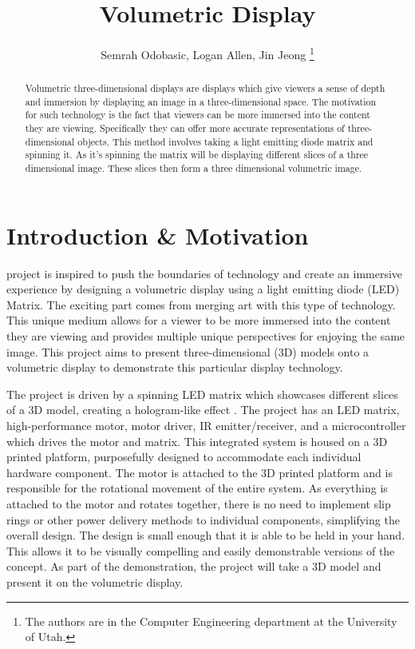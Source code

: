 \documentclass[11pt,journal]{IEEEtran}
\begin{document}
\title{Volumetric Display}

\author{Semrah Odobasic, Logan Allen, Jin Jeong
  \thanks{The authors are in the Computer Engineering
    department at the University of Utah.}
}
\maketitle

\begin{abstract}
 Volumetric three-dimensional displays are displays which give viewers a sense of depth and immersion by displaying an image in a three-dimensional space. The motivation for such technology is the fact that viewers can be more immersed into the content they are viewing. Specifically they can offer more accurate representations of three-dimensional objects. This method involves taking a light emitting diode matrix and spinning it. As it’s spinning the matrix will be displaying different slices of a three dimensional image. These slices then form a three dimensional volumetric image.


\end{abstract}

\section{Introduction \& Motivation}

 project is inspired to push the boundaries of technology and create an immersive experience by designing a volumetric display using a light emitting diode (LED) Matrix. The exciting part comes from merging art with this type of technology. This unique medium allows for a viewer to be more immersed into the content they are viewing and provides multiple unique perspectives for enjoying the same image. This project aims to present three-dimensional (3D) models onto a volumetric display to demonstrate this particular display technology.

The project is driven by a spinning LED matrix which showcases different slices of a 3D model, creating a hologram-like effect \cite{Sun2012ADP}. The project has an LED matrix, high-performance motor, motor driver, IR emitter/receiver, and a microcontroller which drives the motor and matrix. This integrated system is housed on a 3D printed platform, purposefully designed to accommodate each individual hardware component. The motor is attached to the 3D printed platform and is responsible for the rotational movement of the entire system. As everything is attached to the motor and rotates together, there is no need to implement slip rings or other power delivery methods to individual components, simplifying the overall design. The design is small enough that it is able to be held in your hand. This allows it to be visually compelling and easily demonstrable versions of the concept. As part of the demonstration, the project will take a 3D model and present it on the volumetric display.
\end{document}
